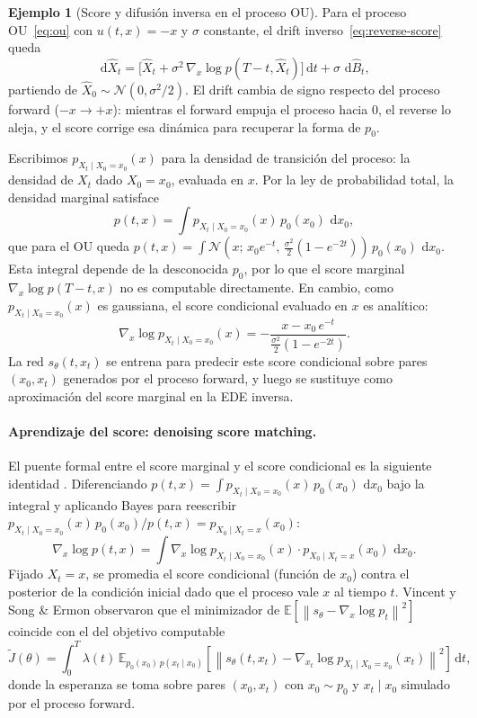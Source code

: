 \documentclass[12pt, a4paper]{report}
\theoremstyle{plain}
\theoremstyle{definition}
\newtheorem{example}{Ejemplo}[chapter]
\theoremstyle{remark}
\newcommand{\E}{\mathbb{E}}
\newcommand{\dd}{\,\mathrm{d}}
\newcommand{\norm}[1]{\left\|#1\right\|}
\begin{document}
\begin{example}[Score y difusión inversa en el proceso OU]
\label{ex:score-ou}
Para el proceso OU~\eqref{eq:ou} con $u(t,x) = -x$ y $\sigma$ constante, el drift inverso~\eqref{eq:reverse-score} queda
\[
  \dd\hat{X}_t = \bigl[\hat{X}_t + \sigma^2\,\nabla_x\log p(T-t,\hat{X}_t)\bigr]\dd t + \sigma\,\dd\hat{B}_t,
\]
partiendo de $\hat{X}_0 \sim \mathcal{N}(0,\sigma^2/2)$. El drift cambia de signo respecto del proceso forward ($-x \to +x$): mientras el forward empuja el proceso hacia $0$, el reverse lo aleja, y el score corrige esa dinámica para recuperar la forma de $p_0$.

Escribimos $p_{X_t \mid X_0=x_0}(x)$ para la densidad de transición del proceso: la densidad de $X_t$ dado $X_0 = x_0$, evaluada en $x$. Por la ley de probabilidad total, la densidad marginal satisface
\[
  p(t,x) = \int p_{X_t \mid X_0=x_0}(x)\,p_0(x_0)\,\dd x_0,
\]
que para el OU queda $p(t,x) = \int \mathcal{N}(x;\,x_0 e^{-t},\,\tfrac{\sigma^2}{2}(1-e^{-2t}))\,p_0(x_0)\,\dd x_0$. Esta integral depende de la desconocida $p_0$, por lo que el score marginal $\nabla_x \log p(T-t,x)$ no es computable directamente. En cambio, como $p_{X_t \mid X_0=x_0}(x)$ es gaussiana, el score condicional evaluado en $x$ es analítico:
\[
  \nabla_x \log p_{X_t \mid X_0=x_0}(x) = -\frac{x - x_0\,e^{-t}}{\tfrac{\sigma^2}{2}(1-e^{-2t})}.
\]
La red $s_\theta(t,x_t)$ se entrena para predecir este score condicional sobre pares $(x_0, x_t)$ generados por el proceso forward, y luego se sustituye como aproximación del score marginal en la EDE inversa.
\end{example}

\paragraph{Aprendizaje del score: denoising score matching.}

El puente formal entre el score marginal y el score condicional es la siguiente identidad \cite{Hyvarinen2005}. Diferenciando $p(t,x) = \int p_{X_t \mid X_0=x_0}(x)\,p_0(x_0)\,\dd x_0$ bajo la integral y aplicando Bayes para reescribir $p_{X_t \mid X_0=x_0}(x)\,p_0(x_0)/p(t,x) = p_{X_0 \mid X_t=x}(x_0)$:
\[
  \nabla_x \log p(t,x)
  = \int \nabla_x \log p_{X_t \mid X_0=x_0}(x)\cdot p_{X_0 \mid X_t=x}(x_0)\,\dd x_0.
\]
Fijado $X_t = x$, se promedia el score condicional (función de $x_0$) contra el posterior de la condición inicial dado que el proceso vale $x$ al tiempo $t$. Vincent \cite{Vincent2011} y Song \& Ermon \cite{Song2021} observaron que el minimizador de $\E[\norm{s_\theta - \nabla_x \log p_t}^2]$ coincide con el del objetivo computable
\[
  \tilde{J}(\theta) = \int_0^T \lambda(t)\,\E_{p_0(x_0)\,p(x_t \mid x_0)}\!\left[
    \norm{s_\theta(t,x_t) - \nabla_{x_t}\log p_{X_t \mid X_0=x_0}(x_t)}^2
  \right]\dd t,
\]
donde la esperanza se toma sobre pares $(x_0, x_t)$ con $x_0 \sim p_0$ y $x_t \mid x_0$ simulado por el proceso forward.
\end{document}
